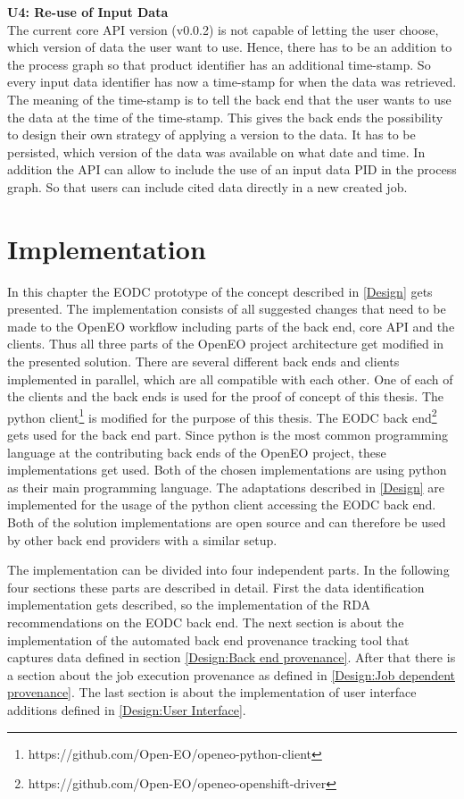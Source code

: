 \documentclass[draft,final]{vutinfth} %
\begin{document}
\textbf{U4: Re-use of Input Data} \\
The current core API version (v0.0.2) is not capable of letting the user choose, which version of data the user want to use. Hence, there has to be an addition to the process graph so that product identifier has an additional time-stamp. So every input data identifier has now a time-stamp for when the data was retrieved. The meaning of the time-stamp is to tell the back end that the user wants to use the data at the time of the time-stamp. This gives the back ends the possibility to design their own strategy of applying a version to the data. It has to be persisted, which version of the data was available on what date and time. In addition the API can allow to include the use of an input data PID in the process graph. So that users can include cited data directly in a new created job.  


\chapter{Implementation}\label{Implementation}
In this chapter the EODC prototype of the concept described in \ref{Design} gets presented. The implementation consists of all suggested changes that need to be made to the OpenEO workflow including parts of the back end, core API and the clients. Thus all three parts of the OpenEO project architecture get modified in the presented solution. There are several different back ends and clients implemented in parallel, which are all compatible with each other. One of each of the clients and the back ends is used for the proof of concept of this thesis. The python client\footnote{https://github.com/Open-EO/openeo-python-client} is modified for the purpose of this thesis. The EODC back end\footnote{https://github.com/Open-EO/openeo-openshift-driver} gets used for the back end part. Since python is the most common programming language at the contributing back ends of the OpenEO project, these implementations get used. Both of the chosen implementations are using python as their main programming language. The adaptations described in \ref{Design} are implemented for the usage of the python client accessing the EODC back end. Both of the solution implementations are open source and can therefore be used by other back end providers with a similar setup.  

The implementation can be divided into four independent parts. In the following four sections these parts are described in detail. First the data identification implementation gets described, so the implementation of the RDA recommendations on the EODC back end. The next section is about the implementation of the automated back end provenance tracking tool that captures data defined in section \ref{Design:Back end provenance}. After that there is a section about the job execution provenance as defined in \ref{Design:Job dependent provenance}. The last section is about the implementation of user interface additions defined in \ref{Design:User Interface}.     
\end{document}
